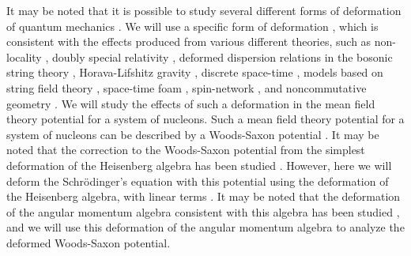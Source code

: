 \documentclass[12pt]{article}
\begin{document}
It may be noted that it is possible to study several different forms of deformation of quantum mechanics \cite{qft2, qft4, qft5, qft6, qft7}. We will use a specific form of  deformation \cite{line12, line14, bb1,bb2,bb3,bb4,bb5,bb6,bb7,line16, line18}, which is consistent with the effects produced from  various  different theories, such as non-locality \cite{nonl}, doubly special relativity \cite{dsr}, deformed dispersion relations in the bosonic string theory \cite{stri}, Horava-Lifshitz gravity \cite{HoravaPRD, HoravaPRL}, discrete space-time \cite{Hooft}, models based on string 
field theory \cite{Samuel1}, space-time foam \cite{Ellis}, spin-network \cite{Gambini}, 
and noncommutative geometry \cite{Carroll}. 
We will study the effects of such a deformation in the mean field theory  potential for a system of  nucleons. Such a mean field theory potential for a system of  nucleons can be described by a  Woods-Saxon potential \cite{wood, wood1, wood2, wood4, wood5}.  It may be noted that the correction to the Woods-Saxon potential from the simplest deformation of the Heisenberg algebra has been studied \cite{dwood, dwood1, dwood2, dwood4, dwood5}. 
However, here we will deform the Schr\"{o}dinger's equation with this  potential using the  deformation of the Heisenberg algebra, with linear terms  \cite{line12, line14, bb1,bb2,bb3,bb4,bb5,bb6,bb7, line16, line18}. It may be noted that the deformation of the angular momentum algebra consistent with this algebra has been studied \cite{an12, an14}, and we will use this deformation of the angular momentum algebra to analyze the deformed Woods-Saxon potential. 

\end{document}
